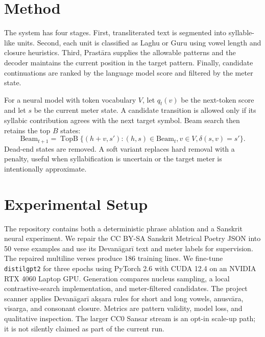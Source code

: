 \documentclass[conference]{IEEEtran}
\begin{document}
\section{Method}
The system has four stages. First, transliterated text is segmented into syllable-like units. Second, each unit is classified as Laghu or Guru using vowel length and closure heuristics. Third, Prastāra supplies the allowable patterns and the decoder maintains the current position in the target pattern. Finally, candidate continuations are ranked by the language model score and filtered by the meter state.

For a neural model with token vocabulary $V$, let $q_t(v)$ be the next-token score and let $s$ be the current meter state. A candidate transition is allowed only if its syllabic contribution agrees with the next target symbol. Beam search then retains the top $B$ states:
\begin{equation}
\mathrm{Beam}_{t+1}=\operatorname{TopB}\{(h+v,s') : (h,s)\in\mathrm{Beam}_t, v\in V, \delta(s,v)=s'\}.
\end{equation}
Dead-end states are removed. A soft variant replaces hard removal with a penalty, useful when syllabification is uncertain or the target meter is intentionally approximate.

\section{Experimental Setup}
The repository contains both a deterministic phrase ablation and a Sanskrit neural experiment. We repair the CC BY-SA Sanskrit Metrical Poetry JSON into 50 verse examples and use its Devanāgarī text and meter labels for supervision. The repaired multiline verses produce 186 training lines. We fine-tune \texttt{distilgpt2} for three epochs using PyTorch 2.6 with CUDA 12.4 on an NVIDIA RTX 4060 Laptop GPU. Generation compares nucleus sampling, a local contrastive-search implementation, and meter-filtered candidates. The project scanner applies Devanāgarī akṣara rules for short and long vowels, anusvāra, visarga, and consonant closure. Metrics are pattern validity, model loss, and qualitative inspection. The larger CC0 Sansar stream is an opt-in scale-up path; it is not silently claimed as part of the current run.
\end{document}
